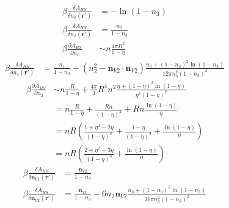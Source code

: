 \documentclass[letterpaper,twocolumn,amsmath,amssymb,jcp,10pt,aip]{revtex4-1}
\begin{document}
\begin{align}
    \beta\frac{\delta A_{HS}}{\delta n_0(\mathbf{r}')} &= -\ln(1-n_3)
    \\
    \beta\frac{\delta A_{HS}}{\delta n_1(\mathbf{r}')} &= \frac{n_2}{1-n_3}
    \\
    \beta\frac{\partial A_{HS}}{\partial n_1}
    &\sim n \frac{4\pi R^2}{1-\eta}
\end{align}
\begin{align}
    \beta\frac{\delta A_{HS}}{\delta n_2(\mathbf{r}')} &=
      \frac{n_1}{1-n_3}
      + (n_2^2 - \mathbf{n}_{V2}\cdot\mathbf{n}_{V2})\frac{n_3 +
        (1-n_3)^2\ln(1-n_3)}{
        12\pi n_3^2(1-n_3)^2
      }
\end{align}
\begin{align}
    \beta\frac{\partial A_{HS}}{\partial n_2}
    &\sim n\frac{R}{1-\eta} +
    \frac{4\pi}{3} R^4 n^2 \frac{\eta + (1-\eta)^2\ln(1-\eta)}{\eta^2(1-\eta)^2}
    \\
    &= n\frac{R}{1-\eta} +
    \frac{R n}{(1-\eta)^2}
    + Rn \frac{\ln(1-\eta)}{\eta}
    \\
    &= nR\left( \frac{1 + \eta^2  - 2\eta}{(1-\eta)^3} +
      \frac{1 - \eta}{(1-\eta)^3}
    + \frac{\ln(1-\eta)}{\eta}
    \right)
    \\
    &= nR\left( \frac{2 + \eta^2  - 3\eta}{(1-\eta)^3}
    + \frac{\ln(1-\eta)}{\eta}
    \right)
\end{align}
\begin{align}
    \beta\frac{\delta A_{HS}}{\delta \mathbf{n}_{V1}(\mathbf{r}')} &=
      \frac{\mathbf{n}_{V2}}{1-n_3}
    \\
    \beta\frac{\delta A_{HS}}{\delta \mathbf{n}_{V2}(\mathbf{r}')} &=
      \frac{\mathbf{n}_{V1}}{1-n_3}
      - 6 n_2 \mathbf{n}_{V2} \frac{n_3 +
        (1-n_3)^2\ln(1-n_3)}{
        36\pi n_3^2(1-n_3)^2
      }
  \end{align}
\end{document}
